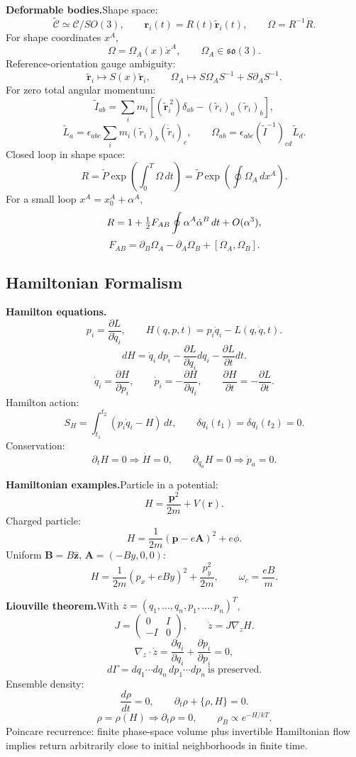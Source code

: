 \noindent\textbf{Deformable bodies.}\quad Shape space:
\[
\widetilde{\mathcal C}\simeq\mathcal C/SO(3),\qquad
\mathbf r_i(t)=R(t)\tilde{\mathbf r}_i(t),\qquad
\Omega=R^{-1}\dot R.
\]
For shape coordinates $x^A$,
\[
\Omega=\Omega_A(x)\dot x^A,\qquad \Omega_A\in\mathfrak{so}(3).
\]
Reference-orientation gauge ambiguity:
\[
\tilde{\mathbf r}_i\mapsto S(x)\tilde{\mathbf r}_i,\qquad
\Omega_A\mapsto S\Omega_AS^{-1}+S\partial_AS^{-1}.
\]
For zero total angular momentum:
\[
\tilde I_{ab}=\sum_i m_i[(\tilde{\mathbf r}_i^{\,2})\delta_{ab}
-(\tilde r_i)_a(\tilde r_i)_b],
\]
\[
\tilde L_a=\epsilon_{abc}\sum_i m_i(\tilde r_i)_b(\dot{\tilde r}_i)_c,
\qquad
\boxed{\Omega_{ab}=\epsilon_{abc}(\tilde I^{-1})_{cd}\tilde L_d}.
\]
Closed loop in shape space:
\[
R=\widetilde P\exp\left(\int_0^T\Omega\,dt\right)
=\widetilde P\exp\left(\oint\Omega_A\,dx^A\right).
\]
For a small loop $x^A=x_0^A+\alpha^A$,
\[
R=1+\tfrac{1}{2} F_{AB}\oint\alpha^A\dot\alpha^B\,dt+O(\alpha^3),
\]
\[
F_{AB}=\partial_B\Omega_A-\partial_A\Omega_B+[\Omega_A,\Omega_B].
\]

\subsection{Hamiltonian Formalism}

\noindent\textbf{Hamilton equations.}\quad
\[
p_i=\frac{\partial L}{\partial\dot q_i},\qquad
H(q,p,t)=p_i\dot q_i-L(q,\dot q,t).
\]
\[
dH=\dot q_i\,dp_i-\frac{\partial L}{\partial q_i}dq_i
-\frac{\partial L}{\partial t}dt.
\]
\[
\boxed{\dot q_i=\frac{\partial H}{\partial p_i},\qquad
\dot p_i=-\frac{\partial H}{\partial q_i}},\qquad
\frac{\partial H}{\partial t}=-\frac{\partial L}{\partial t}.
\]
Hamilton action:
\[
S_H=\int_{t_1}^{t_2}(p_i\dot q_i-H)\,dt,\qquad
\delta q_i(t_1)=\delta q_i(t_2)=0.
\]
Conservation:
\[
\partial_tH=0\Rightarrow\dot H=0,\qquad
\partial_{q_a}H=0\Rightarrow\dot p_a=0.
\]

\noindent\textbf{Hamiltonian examples.}\quad Particle in a potential:
\[
H=\frac{\mathbf p^2}{2m}+V(\mathbf r).
\]
Charged particle:
\[
H=\frac{1}{2m}(\mathbf p-e\mathbf A)^2+e\phi.
\]
Uniform $\mathbf B=B\hat{\mathbf z}$, $\mathbf A=(-By,0,0)$:
\[
H=\frac{1}{2m}(p_x+eBy)^2+\frac{p_y^2}{2m},\qquad
\omega_c=\frac{eB}{m}.
\]

\noindent\textbf{Liouville theorem.}\quad With
$z=(q_1,\ldots,q_n,p_1,\ldots,p_n)^T$,
\[
J=\begin{pmatrix}0&I\\-I&0\end{pmatrix},\qquad
\dot z=J\nabla_zH.
\]
\[
\nabla_z\cdot\dot z
=\frac{\partial\dot q_i}{\partial q_i}
+\frac{\partial\dot p_i}{\partial p_i}=0,
\]
\[
\boxed{d\Gamma=dq_1\cdots dq_n\,dp_1\cdots dp_n\ \text{is preserved}}.
\]
Ensemble density:
\[
\frac{d\rho}{dt}=0,\qquad
\boxed{\partial_t\rho+\{\rho,H\}=0}.
\]
\[
\rho=\rho(H)\Rightarrow\partial_t\rho=0,\qquad
\rho_B\propto e^{-H/kT}.
\]
Poincare recurrence: finite phase-space volume plus invertible Hamiltonian flow
implies return arbitrarily close to initial neighborhoods in finite time.

